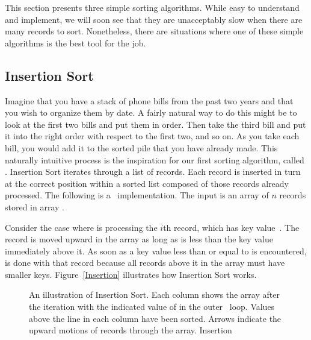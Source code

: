 This section presents three simple sorting algorithms.
While easy to understand and implement, we will soon see that they are
unacceptably slow when there are many records to sort.
Nonetheless, there are situations where one of these simple algorithms
is the best tool for the job.

\subsection{Insertion Sort}
\label{InsSort}

Imagine that you have a stack of phone bills from the past two years
and that you wish to organize them by date.
A fairly natural way to do this might be to look at the first two
bills and put them in order.
Then take the third bill and put it into the right order with respect
to the first two, and so on.
As you take each bill, you would add it to the sorted pile that you
have already made.
This naturally intuitive process is the inspiration for
our first sorting algorithm, called .
Insertion Sort iterates through a list of records.
Each record is inserted in turn at the correct position
within a sorted list composed of those records already processed.
The following is a \Lang\ implementation.
The input is an array of \(n\) records stored in array .


Consider the case where  is processing the \(i\)th
record, which has key value~.
The record is moved upward in the array as long as  is less
than the key value immediately above it.
As soon as a key value less than or equal to  is encountered,
 is done with that record because all records above it
in the array must have smaller keys.
Figure~\ref{Insertion} illustrates how Insertion Sort works.

\begin{figure}
\vspace{-\medskipamount}

{An illustration of Insertion Sort.
Each column shows the array after the iteration with the indicated
value of  in the outer \Cfor\ loop.
Values above the line in each column have been sorted.
Arrows indicate the upward motions of records through the array.}
{Insertion}
\medskip
\end{figure}


